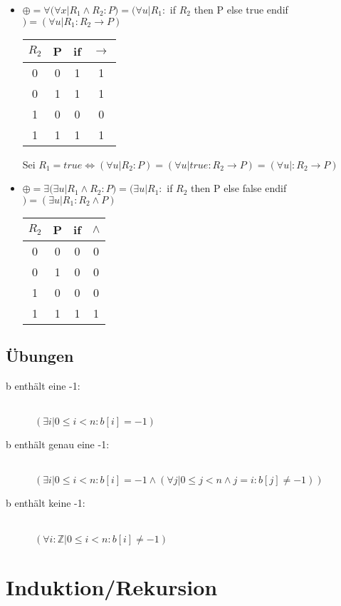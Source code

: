 \documentclass[a4paper,10pt]{article}
\newcommand{\ZN}{\mathbb{Z}} %
\newcommand{\ra}{\rightarrow}
\begin{document}
\begin{itemize}
	\item $ \oplus =\forall  (\forall x | R_1 \wedge R_2:P)=(\forall u | R_1:$ if $R_2$ then P else true endif $)=(\forall u | R_1:R_2\rightarrow P)$ \\
	\begin{tabular}{| c c | c c |}
		\hline
			$R_2$ & P & if & $\rightarrow$ \\
		\hline
			0 & 0 & 1 & 1 \\
			0 & 1 & 1 & 1 \\
			1 & 0 & 0 & 0 \\
			1 & 1 & 1 & 1 \\
		\hline
	\end{tabular} Sei $R_1 = true \Longleftrightarrow (\forall u | R_2:P)=(\forall u | true: R_2 \ra P)=(\forall u |:R_2\ra P)$ \\
	\item  $\oplus = \exists (\exists u | R_1 \wedge R_2:P)=(\exists u | R_1:$ if $R_2$ then P else false endif$)=(\exists u | R_1:R_2 \wedge P)$ \\
	\begin{tabular}{| c c | c c |}
		\hline
			$R_2$ & P & if & $\wedge$ \\
		\hline
			0 & 0 & 0 & 0 \\
			0 & 1 & 0 & 0 \\
			1 & 0 & 0 & 0 \\
			1 & 1 & 1 & 1 \\
		\hline
	\end{tabular}
\end{itemize}

\subsection{\"Ubungen}
\begin{description}
	\item[b enth\"alt eine -1:] \hfill \\ $ (\exists i | 0 \leq i < n: b[i]=-1)$
	\item[b enth\"alt genau eine -1:] \hfill \\ $(\exists i | 0 \leq i < n: b[i]=-1 \wedge (\forall j | 0\leq j < n \wedge j=i : b[j]\neq-1))$
	\item[b enth\"alt keine -1:] \hfill \\ $(\forall i:\ZN|0\leq i < n : b[i]\neq-1)$
\end{description}

\newpage
\section{Induktion/Rekursion}
\end{document}
